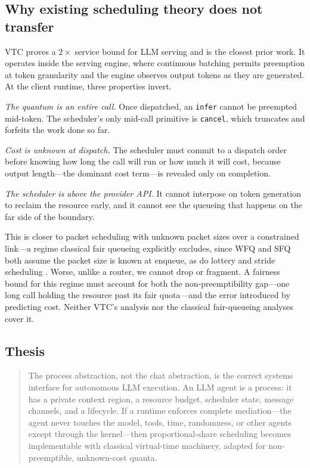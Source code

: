 \documentclass[letterpaper,11pt,leqno]{article}
\begin{document}
\subsection{Why existing scheduling theory does not transfer}\label{s:theorygap}

VTC \citep{Sheng24} proves a $2\times$ service bound for LLM serving and is the closest prior work. It operates inside the serving engine, where continuous batching \citep{Yu22} permits preemption at token granularity and the engine observes output tokens as they are generated. At the client runtime, three properties invert.

\emph{The quantum is an entire call.} Once dispatched, an \texttt{infer} cannot be preempted mid-token. The scheduler's only mid-call primitive is \texttt{cancel}, which truncates and forfeits the work done so far.

\emph{Cost is unknown at dispatch.} The scheduler must commit to a dispatch order before knowing how long the call will run or how much it will cost, because output length---the dominant cost term---is revealed only on completion.

\emph{The scheduler is above the provider API.} It cannot interpose on token generation to reclaim the resource early, and it cannot see the queueing that happens on the far side of the boundary.

This is closer to packet scheduling with unknown packet sizes over a constrained link---a regime classical fair queueing explicitly excludes, since WFQ \citep{Demers89} and SFQ \citep{Goyal96} both assume the packet size is known at enqueue, as do lottery and stride scheduling \citep{Waldspurger94, Waldspurger95}. Worse, unlike a router, we cannot drop or fragment. A fairness bound for this regime must account for both the non-preemptibility gap---one long call holding the resource past its fair quota---and the error introduced by predicting cost. Neither VTC's analysis nor the classical fair-queueing analyses cover it.

\subsection{Thesis}\label{s:thesis}

\begin{quote}
The process abstraction, not the chat abstraction, is the correct systems interface for autonomous LLM execution. An LLM agent is a process: it has a private context region, a resource budget, scheduler state, message channels, and a lifecycle. If a runtime enforces complete mediation---the agent never touches the model, tools, time, randomness, or other agents except through the kernel---then proportional-share scheduling becomes implementable with classical virtual-time machinery, adapted for non-preemptible, unknown-cost quanta.
\end{quote}
\end{document}
